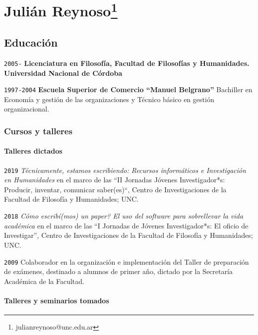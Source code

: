 \documentclass[]{article}
\let\oldparagraph\paragraph
\renewcommand{\paragraph}[1]{\oldparagraph{#1}\mbox{}}
\begin{document}
\hypertarget{juliuxe1n-reynoso}{%
\section{Julián Reynoso\footnote{julianreynoso@unc.edu.ar}}\label{juliuxe1n-reynoso}}


\hypertarget{educaciuxf3n}{%
\subsection{Educación}\label{educaciuxf3n}}

\texttt{2005-} \textbf{Licenciatura en Filosofía, Facultad de Filosofías
y Humanidades. Universidad Nacional de Córdoba}

\texttt{1997-2004} \textbf{Escuela Superior de Comercio ``Manuel
Belgrano''} Bachiller en Economía y gestión de las organizaciones y
Técnico básico en gestión organizacional.

\hypertarget{cursos-y-talleres}{%
\subsubsection{Cursos y talleres}\label{cursos-y-talleres}}

\hypertarget{talleres-dictados}{%
\paragraph{Talleres dictados}\label{talleres-dictados}}

\texttt{2019} \emph{Técnicamente, estamos escribiendo: Recursos
informáticos e Investigación en Humanidades} en el marco de las ``II
Jornadas Jóvenes Investigador*s: Producir, inventar, comunicar
saber(es)``, Centro de Investigaciones de la Facultad de Filosofía y
Humanidades; UNC.

\texttt{2018} \emph{Cómo escribí(mos) un paper? El uso del software para
sobrellevar la vida académica} en el marco de las ``I Jornadas de
Jóvenes Investigador*s: El oficio de Investigar'', Centro de
Investigaciones de la Facultad de Filosofía y Humanidades; UNC.

\texttt{2009} Colaborador en la organización e implementación del Taller
de preparación de exámenes, destinado a alumnos de primer año, dictado
por la Secretaría Académica de la Facultad.

\hypertarget{talleres-y-seminarios-tomados}{%
\paragraph{Talleres y seminarios
tomados}\label{talleres-y-seminarios-tomados}}
\end{document}

